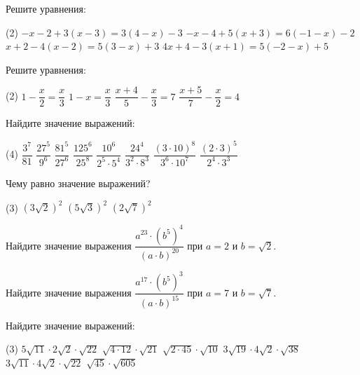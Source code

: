 \begin{class}[number=8]
	\begin{listofex}
		\item Решите уравнения:
		\begin{tasks}(2)
			\task \( -x-2+3(x-3)=3(4-x)-3 \)
			\task \( -x-4+5(x+3)=6(-1-x)-2 \)
			\task \( x+2-4(x-2)=5(3-x)+3 \)
			\task \( 4x+4-3(x+1)=5(-2-x)+5 \)
		\end{tasks}
		\item Решите уравнения:
		\begin{tasks}(2)
			\task \( 1-\dfrac{x}{2}=\dfrac{x}{3} \)
			\task \( 1-x=\dfrac{x}{3} \)
			\task \( \dfrac{x+4}{5}-\dfrac{x}{3}=7 \)
			\task \( \dfrac{x+5}{7}-\dfrac{x}{2}=4 \)
		\end{tasks}
		\item Найдите значение выражений:
		\begin{tasks}(4)
			\task \( \dfrac{3^7}{81} \)
			\task \( \dfrac{27^5}{9^6} \)
			\task \( \dfrac{81^5}{27^6} \)
			\task \( \dfrac{125^6}{25^8} \)
			\task \( \dfrac{10^6}{2^5\cdot5^4} \)
			\task \( \dfrac{24^4}{3^2\cdot8^3} \)
			\task \( \dfrac{(3\cdot10)^8}{3^6\cdot10^7} \)
			\task \( \dfrac{(2\cdot3)^5}{2^4\cdot3^3} \)
		\end{tasks}
		\item Чему равно значение выражений?
		\begin{tasks}(3)
			\task \( (3\sqrt{2})^2 \)
			\task \( (5\sqrt{3})^2 \)
			\task \( (2\sqrt{7})^2 \)
		\end{tasks}
		\item Найдите значение выражения \( \dfrac{a^{23}\cdot(b^5)^4}{(a\cdot b)^{20}} \) при \( a=2 \) и \( b=\sqrt{2} \).
		\item Найдите значение выражения \( \dfrac{a^{17}\cdot(b^5)^3}{(a\cdot b)^{15}} \) при \( a=7 \) и \( b=\sqrt{7} \).
		\item Найдите значение выражений:
		\begin{tasks}(3)
			\task \( 5\sqrt{11}\cdot2\sqrt{2}\cdot\sqrt{22} \)
			\task \( \sqrt{4\cdot12}\cdot\sqrt{21} \)
			\task \( \sqrt{2\cdot45}\cdot\sqrt{10} \)
			\task \( 3\sqrt{19}\cdot4\sqrt{2}\cdot\sqrt{38} \)
			\task \( 3\sqrt{11}\cdot4\sqrt{2}\cdot\sqrt{22} \)
			\task \( \sqrt{45}\cdot\sqrt{605} \)
		\end{tasks}
	\end{listofex}
\end{class}

